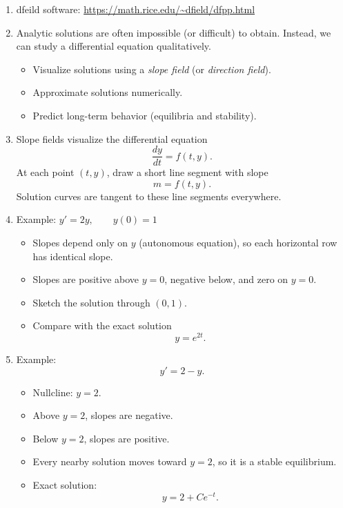 \documentclass{article}
\begin{document}
\begin{enumerate}

\item dfeild software: \url{https://math.rice.edu/~dfield/dfpp.html}

\item Analytic solutions are often impossible (or difficult) to obtain. Instead, we can study a differential equation qualitatively.
\begin{itemize}
\item Visualize solutions using a \emph{slope field} (or \emph{direction field}).
\item Approximate solutions numerically.
\item Predict long-term behavior (equilibria and stability).
\end{itemize}

\item Slope fields visualize the differential equation
\[
\frac{dy}{dt}=f(t,y).
\]
At each point $(t,y)$, draw a short line segment with slope
\[
m=f(t,y).
\]
Solution curves are tangent to these line segments everywhere.

\item Example: $\displaystyle y'=2y,\qquad y(0)=1$
\begin{itemize}
\item Slopes depend only on $y$ (autonomous equation), so each horizontal row has identical slope.
\item Slopes are positive above $y=0$, negative below, and zero on $y=0$.
\item Sketch the solution through $(0,1)$.
\item Compare with the exact solution
\[
y=e^{2t}.
\]
\end{itemize}

\item Example:
\[
y'=2-y.
\]
\begin{itemize}
\item Nullcline: $y=2$.
\item Above $y=2$, slopes are negative.
\item Below $y=2$, slopes are positive.
\item Every nearby solution moves toward $y=2$, so it is a stable equilibrium.
\item Exact solution:
\[
y=2+Ce^{-t}.
\]
\end{itemize}


\end{enumerate}
\end{document}
